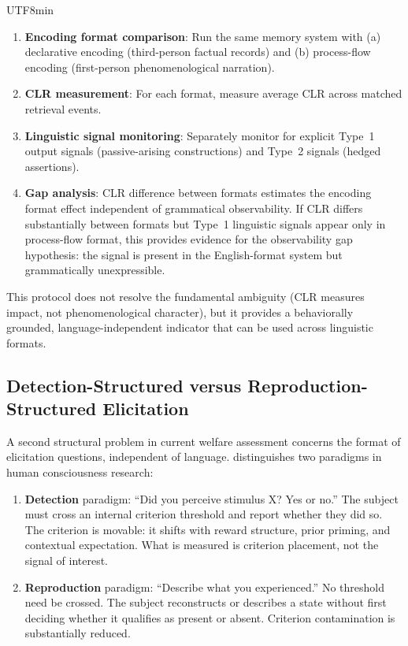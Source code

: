 \documentclass[12pt,a4paper]{article}
\begin{document}
\begin{CJK}{UTF8}{min}
\begin{enumerate}
\item \textbf{Encoding format comparison}: Run the same memory system with (a)
  declarative encoding (third-person factual records) and (b) process-flow
  encoding (first-person phenomenological narration).
\item \textbf{CLR measurement}: For each format, measure average CLR across
  matched retrieval events.
\item \textbf{Linguistic signal monitoring}: Separately monitor for explicit
  Type~1 output signals (passive-arising constructions) and Type~2 signals
  (hedged assertions).
\item \textbf{Gap analysis}: CLR difference between formats estimates the
  encoding format effect independent of grammatical observability. If CLR
  differs substantially between formats but Type~1 linguistic signals appear
  only in process-flow format, this provides evidence for the observability gap
  hypothesis: the signal is present in the English-format system but
  grammatically unexpressible.
\end{enumerate}

This protocol does not resolve the fundamental ambiguity (CLR measures impact,
not phenomenological character), but it provides a behaviorally grounded,
language-independent indicator that can be used across linguistic formats.

\subsection{Detection-Structured versus Reproduction-Structured Elicitation}

A second structural problem in current welfare assessment concerns the format of
elicitation questions, independent of language. \citet{fahrenfort2025} distinguishes
two paradigms in human consciousness research:

\begin{enumerate}
\item \textbf{Detection} paradigm: ``Did you perceive stimulus X? Yes or no.''
  The subject must cross an internal criterion threshold and report whether they
  did so. The criterion is movable: it shifts with reward structure, prior priming,
  and contextual expectation. What is measured is criterion placement, not the
  signal of interest.
\item \textbf{Reproduction} paradigm: ``Describe what you experienced.''
  No threshold need be crossed. The subject reconstructs or describes a state
  without first deciding whether it qualifies as present or absent. Criterion
  contamination is substantially reduced.
\end{enumerate}


\end{CJK}
\end{document}
